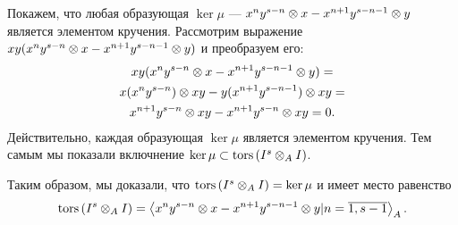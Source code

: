 \begin{Proof}
        Покажем, что любая образующая $\ker \mu$ --- $x^ny^{s - n} \otimes x - x^{n + 1}y^{s - n - 1} \otimes y$
        является элементом кручения. Рассмотрим выражение 
        $xy(x^ny^{s - n} \otimes x - x^{n + 1}y^{s - n - 1} \otimes y)$ и преобразуем его:
        \begin{multline*}
            xy(x^ny^{s - n} \otimes x - x^{n + 1}y^{s - n - 1} \otimes y) = \\
            x(x^ny^{s - n}) \otimes xy - y(x^{n + 1}y^{s - n - 1}) \otimes xy = \\
            x^{n + 1}y^{s - n} \otimes xy - x^{n + 1}y^{s - n} \otimes xy = 0.
        \end{multline*}
        Действительно, каждая образующая $\ker \mu$ является элементом кручения. Тем самым мы показали
        включнение $\ker \mu \subset \textup{tors}\left(I^s \otimes_A I\right)$.

        Таким образом,  мы доказали, что $\textup{tors}\left(I^s \otimes_A I\right) = \ker \mu $ и имеет место равенство
        \begin{equation*}
            \textup{tors}\left(I^s \otimes_A I\right) = \left< x^ny^{s - n} \otimes x - x^{n + 1}y^{s - n - 1} \otimes y |
            n = \overline{1, s-1}\right>_A.
        \end{equation*}
    \end{Proof}

